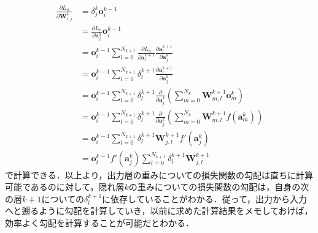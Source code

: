 \documentclass[12pt]{jarticle}
\numberwithin{equation}{section}    %
\numberwithin{figure}{section}      %
\numberwithin{table}{section}      %
\begin{document}
\begin{align}
    \frac{\partial L_{n}}{\partial \bm{W}_{i, j}^{k}} & = \delta_{j}^{k} \bm{o}_{i}^{k - 1}                                                                                                                                                   \\
                                                      & = \frac{\partial L_{n}}{\partial \bm{a}_{j}^{k}} \bm{o}_{i}^{k - 1}                                                                                                                   \\
                                                      & = \bm{o}_{i}^{k - 1} \sum_{l = 0}^{N_{k + 1}} \frac{\partial L_{n}}{\partial \bm{a}_{l}^{k + 1}} \frac{\partial \bm{a}_{l}^{k + 1}}{\partial \bm{a}_{j}^{k}}                          \\
                                                      & = \bm{o}_{i}^{k - 1} \sum_{l = 0}^{N_{k + 1}} \delta_{l}^{k + 1} \frac{\partial \bm{a}_{l}^{k + 1}}{\partial \bm{a}_{j}^{k}}                                                          \\
                                                      & = \bm{o}_{i}^{k - 1} \sum_{l = 0}^{N_{k + 1}} \delta_{l}^{k + 1} \frac{\partial}{\partial \bm{a}_{j}^{k}} \left( \sum_{m = 0}^{N_{k}} \bm{W}_{m, l}^{k + 1} \bm{o}_{m}^{k} \right)    \\
                                                      & = \bm{o}_{i}^{k - 1} \sum_{l = 0}^{N_{k + 1}} \delta_{l}^{k + 1} \frac{\partial}{\partial \bm{a}_{j}^{k}} \left( \sum_{m = 0}^{N_{k}} \bm{W}_{m, l}^{k + 1} f(\bm{a}_{m}^{k}) \right) \\
                                                      & = \bm{o}_{i}^{k - 1} \sum_{l = 0}^{N_{k + 1}} \delta_{l}^{k + 1} \bm{W}_{j, l}^{k + 1} f'(\bm{a}_{j}^{k})                                                                             \\
                                                      & = \bm{o}_{i}^{k - 1} f'(\bm{a}_{j}^{k}) \sum_{l = 0}^{N_{k + 1}} \delta_{l}^{k + 1} \bm{W}_{j, l}^{k + 1}
\end{align}
で計算できる．以上より，出力層の重みについての損失関数の勾配は直ちに計算可能であるのに対して，隠れ層$k$の重みについての損失関数の勾配は，自身の次の層$k + 1$についての$\delta_{l}^{k + 1}$に依存していることがわかる．従って，出力から入力へと遡るように勾配を計算していき，以前に求めた計算結果をメモしておけば，効率よく勾配を計算することが可能だとわかる．
\end{document}
